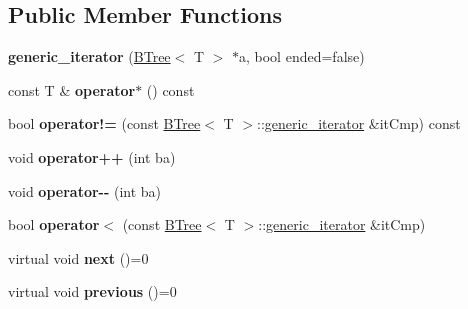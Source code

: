 \subsection*{Public Member Functions}
\begin{DoxyCompactItemize}
\item 
\hypertarget{classBTree_1_1generic__iterator_a31183e4346615e381544b8be76116615}{
{\bfseries generic\_\-iterator} (\hyperlink{classBTree}{BTree}$<$ T $>$ $\ast$a, bool ended=false)}
\label{classBTree_1_1generic__iterator_a31183e4346615e381544b8be76116615}

\item 
\hypertarget{classBTree_1_1generic__iterator_a5c25c709932fd17fce49901183f2ef05}{
const T \& {\bfseries operator$\ast$} () const }
\label{classBTree_1_1generic__iterator_a5c25c709932fd17fce49901183f2ef05}

\item 
\hypertarget{classBTree_1_1generic__iterator_aa5e4397b29577b1521abe69bfd655de4}{
bool {\bfseries operator!=} (const \hyperlink{classBTree}{BTree}$<$ T $>$::\hyperlink{classBTree_1_1generic__iterator}{generic\_\-iterator} \&itCmp) const }
\label{classBTree_1_1generic__iterator_aa5e4397b29577b1521abe69bfd655de4}

\item 
\hypertarget{classBTree_1_1generic__iterator_a97063e8054069f8617a33d724e1b9a6e}{
void {\bfseries operator++} (int ba)}
\label{classBTree_1_1generic__iterator_a97063e8054069f8617a33d724e1b9a6e}

\item 
\hypertarget{classBTree_1_1generic__iterator_a6346430dd259f23502cf7e9d554f9249}{
void {\bfseries operator-\/-\/} (int ba)}
\label{classBTree_1_1generic__iterator_a6346430dd259f23502cf7e9d554f9249}

\item 
\hypertarget{classBTree_1_1generic__iterator_aa57f2dd869732866ef41fb69ca030d8f}{
bool {\bfseries operator$<$} (const \hyperlink{classBTree}{BTree}$<$ T $>$::\hyperlink{classBTree_1_1generic__iterator}{generic\_\-iterator} \&itCmp)}
\label{classBTree_1_1generic__iterator_aa57f2dd869732866ef41fb69ca030d8f}

\item 
\hypertarget{classBTree_1_1generic__iterator_a0d4c520d3ead2973da2f00821f198461}{
virtual void {\bfseries next} ()=0}
\label{classBTree_1_1generic__iterator_a0d4c520d3ead2973da2f00821f198461}

\item 
\hypertarget{classBTree_1_1generic__iterator_a4d3f188208d81f5091d36a4ebc79606e}{
virtual void {\bfseries previous} ()=0}
\label{classBTree_1_1generic__iterator_a4d3f188208d81f5091d36a4ebc79606e}


\end{DoxyCompactItemize}

